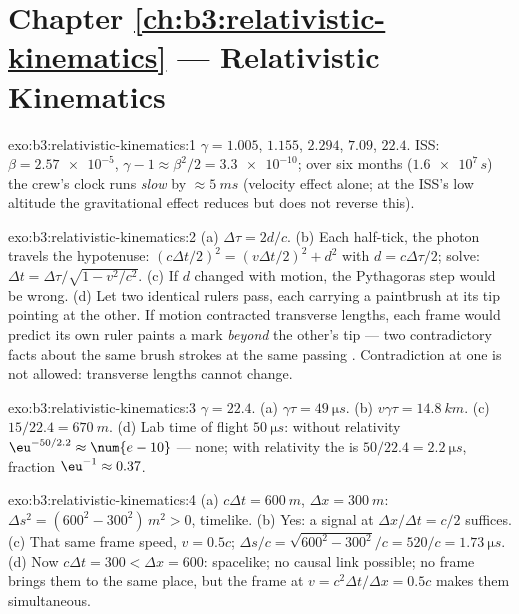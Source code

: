 \section*{Chapter \ref{ch:b3:relativistic-kinematics} --- Relativistic Kinematics}

\begin{solution}{exo:b3:relativistic-kinematics:1}
$\gamma = 1.005$, $1.155$, $2.294$, $7.09$, $22.4$. ISS: $\beta =
\num{2.57e-5}$, $\gamma - 1 \approx \beta^2/2 = \num{3.3e-10}$; over
six months ($\num{1.6e7}{}\,\unit{s}$) the crew's clock runs
\emph{slow} by $\approx\qty{5}{ms}$ (velocity effect alone; at the
ISS's low altitude the gravitational effect reduces but does not
reverse this).
\end{solution}

\begin{solution}{exo:b3:relativistic-kinematics:2}
(a) $\Delta\tau = 2d/c$. (b) Each half-tick, the photon travels the
hypotenuse: $(c\Delta t/2)^2 = (v\Delta t/2)^2 + d^2$ with $d =
c\Delta\tau/2$; solve: $\Delta t = \Delta\tau/\sqrt{1 - v^2/c^2}$. (c)
If $d$ changed with motion, the Pythagoras step would be wrong. (d)
Let two identical rulers pass, each carrying a paintbrush at its tip
pointing at the other. If motion contracted transverse lengths, each
frame would predict its own ruler paints a mark \emph{beyond} the
other's tip --- two contradictory facts about the same brush strokes
at the same passing . Contradiction at one  is not allowed:
transverse lengths cannot change.
\end{solution}

\begin{solution}{exo:b3:relativistic-kinematics:3}
$\gamma = 22.4$. (a) $\gamma\tau = \qty{49}{\micro s}$. (b) $v\gamma
\tau = \qty{14.8}{km}$. (c) $15/22.4 = \qty{670}{m}$. (d) Lab time of
flight $\qty{50}{\micro s}$: without relativity
$\eu^{-50/2.2} \approx \num{e-10}$ --- none; with relativity the
 is $50/22.4 = \qty{2.2}{\micro s}$, fraction $\eu^{-1}
\approx 0.37$.
\end{solution}

\begin{solution}{exo:b3:relativistic-kinematics:4}
(a) $c\Delta t = \qty{600}{m}$, $\Delta x = \qty{300}{m}$: $\Delta s^2
= (600^2 - 300^2)\,\unit{m^2} > 0$, timelike. (b) Yes: a signal at
$\Delta x/\Delta t = c/2$ suffices. (c) That same frame speed, $v =
0.5c$;  $\Delta s/c = \sqrt{600^2 - 300^2}/c = 520/c =
\qty{1.73}{\micro s}$. (d) Now $c\Delta t = 300 < \Delta x = 600$:
spacelike; no causal link possible; no frame brings them to the same
place, but the frame at $v = c^2\Delta t/\Delta x = 0.5c$ makes them
simultaneous.
\end{solution}

